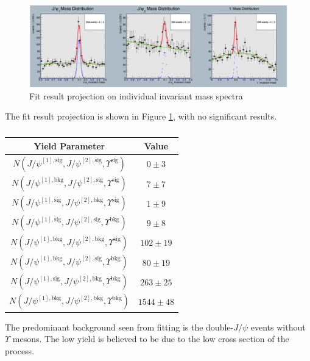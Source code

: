 \documentclass[10pt,twocolumn]{article}
\begin{document}
\begin{figure}
    \centering
    \includegraphics[width=1.0\linewidth]{images/JpsiJpsiY_fit.png}
    \caption{Fit result projection on individual invariant mass spectra}
    \label{fig:JpsiJpsiY_fit}
\end{figure}

The fit result projection is shown in Figure  \ref{fig:JpsiJpsiY_fit}, with no significant results.

\begin{table}[]
    \centering
    \caption{}
    \begin{tabular}{cc}
        \toprule
        \textbf{Yield Parameter} & \textbf{Value} \\
        \midrule
        $N(J/\psi^{[1], \text{sig} },J/\psi^{[2],\text{sig} }, \Upsilon^\text{sig})$ & $0 \pm 3$ \\
        $N(J/\psi^{[1], \text{bkg} },J/\psi^{[2],\text{sig} }, \Upsilon^\text{sig})$ & $7 \pm 7$ \\
        $N(J/\psi^{[1], \text{sig} },J/\psi^{[2],\text{bkg} }, \Upsilon^\text{sig})$ & $1 \pm 9$ \\
        $N(J/\psi^{[1], \text{sig} },J/\psi^{[2],\text{sig} }, \Upsilon^\text{bkg})$ & $9 \pm 8$ \\
        $N(J/\psi^{[1], \text{bkg} },J/\psi^{[2],\text{bkg} }, \Upsilon^\text{sig})$ & $102 \pm 19$ \\
        $N(J/\psi^{[1], \text{bkg} },J/\psi^{[2],\text{sig} }, \Upsilon^\text{bkg})$ & $80 \pm 19$ \\
        $N(J/\psi^{[1], \text{sig} },J/\psi^{[2],\text{bkg} }, \Upsilon^\text{bkg})$ & $263 \pm 25$ \\
        $N(J/\psi^{[1], \text{bkg} },J/\psi^{[2],\text{bkg} }, \Upsilon^\text{bkg})$ & $1544 \pm 48$ \\
        \bottomrule
    \end{tabular}
    \label{tab:my_label}
\end{table}

The predominant background seen from fitting is the double-$J/\psi$ events without $\Upsilon$ mesons. The low yield is believed to be due to the low cross section of the process.
\end{document}
